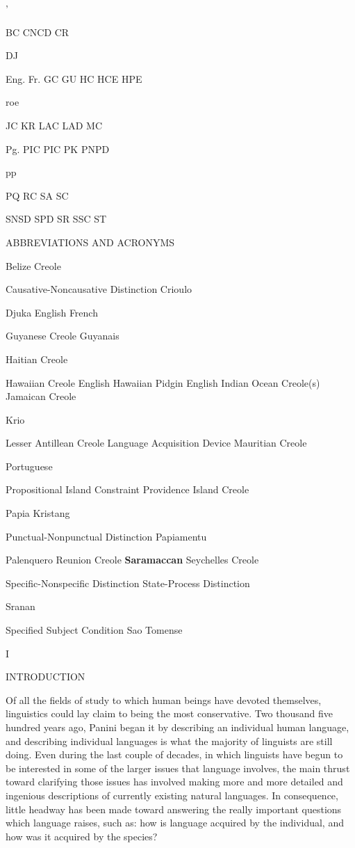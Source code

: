 '

BC CNCD CR

DJ

Eng. Fr. GC GU HC HCE HPE

roe

JC KR LAC LAD MC

Pg. PIC PIC PK PNPD

pp

PQ RC SA SC

SNSD SPD SR SSC ST

ABBREVIATIONS AND ACRONYMS

Belize Creole

Causative-Noncausative Distinction Crioulo

Djuka English French

Guyanese Creole Guyanais

Haitian Creole

Hawaiian Creole English Hawaiian Pidgin English Indian Ocean Creole(s) Jamaican Creole

Krio

Lesser Antillean Creole Language Acquisition Device Mauritian Creole

Portuguese

Propositional Island Constraint Providence Island Creole

Papia Kristang

Punctual-Nonpunctual Distinction Papiamentu

Palenquero Reunion Creole \textbf{Saramaccan} Seychelles Creole

Specific-Nonspecific Distinction State-Process Distinction

Sranan

Specified Subject Condition Sao Tomense

I

\hypertarget{TOC250000}{}INTRODUCTION

Of all the fields of study to which human beings have devoted themselves, linguistics could lay claim to being the most conservative. Two thousand five hundred years ago, Panini began it by describing an individual human language, and describing individual languages is what the majority of linguists are still doing. Even during the last couple of decades, in which linguists have begun to be interested in some of the larger issues that language involves, the main thrust toward clarifying those issues has involved making more and more detailed and ingenious descriptions of currently existing natural languages. In consequence, little headway has been made toward answering the really important questions which language raises, such as: how is language acquired by the individual, and how was it acquired by the species?

